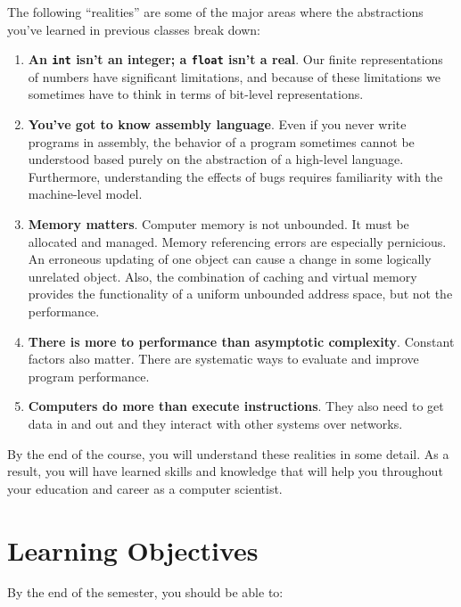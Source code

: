 \documentclass[11pt]{article}
\begin{document}
The following ``realities'' are some of the major areas where the abstractions
you've learned in previous classes break down:
\begin{enumerate}
\item \textbf{An \texttt{int} isn't an integer; a \texttt{float} isn't a real}.
  Our finite representations of numbers have significant limitations,
  and because of these limitations
  we sometimes have to think in terms of bit-level representations.
\item \textbf{You've got to know assembly language}.
  Even if you never write programs in assembly,
  the behavior of a program sometimes cannot be understood
  based purely on the abstraction of a high-level language.
  Furthermore, understanding the effects of bugs
  requires familiarity with the machine-level model.
\item \textbf{Memory matters}.
  Computer memory is not unbounded.
  It must be allocated and managed.
  Memory referencing errors are especially pernicious.
  An erroneous updating of one object can cause a change
  in some logically unrelated object.
  Also, the combination of caching and virtual memory
  provides the functionality of a uniform unbounded address space,
  but not the performance.
\item \textbf{There is more to performance than asymptotic complexity}.
  Constant factors also matter.
  There are systematic ways to evaluate and improve program performance.
\item \textbf{Computers do more than execute instructions}.
  They also need to get data in and out
  and they interact with other systems over networks.
\end{enumerate}

By the end of the course, you will understand these realities in some detail.
As a result, you will have learned skills and knowledge
that will help you throughout your education and career as a computer scientist.

\section{Learning Objectives}

By the end of the semester, you should be able to:
\end{document}
